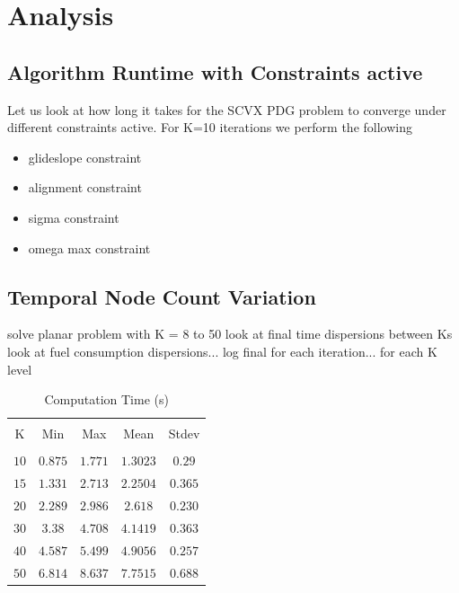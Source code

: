 \chapter{Analysis}
\label{analysis}



\section{Algorithm Runtime with Constraints active}
Let us look at how long it takes for the SCVX PDG problem to converge under different constraints active.  For K=10 iterations we perform the following

\begin{itemize}
	\item  glideslope constraint
	\item alignment constraint
	\item sigma constraint
	\item omega max constraint
\end{itemize}

\section{Temporal Node Count Variation}
solve planar problem with K = 8 to 50
look at final time dispersions between Ks
look at fuel consumption dispersions...
log final for each iteration... for each K level


\begin{table}[ht]
\caption{Computation Time (s)}
\centering 
\begin{tabular}{c c c c c} 
\hline\hline \\[0.5ex] 
K & Min & Max & Mean & Stdev \\ 
\hline \\
$10$    &$0.875 $   &$1.771 $  &$1.3023  $  &$0.29$  \\ 
$15$    &$1.331 $   &$2.713 $  &$2.2504  $  &$0.365$  \\ 
$20$    &$2.289$    &$2.986$   &$2.618  $   &$0.230$  \\ 
$30$    &$ 3.38 $   &$4.708 $  &$4.1419  $  &$0.363$  \\ 
$40$    &$4.587 $   &$5.499 $  &$4.9056  $  &$0.257$  \\ 
$50$    &$6.814 $   &$8.637 $  &$7.7515  $  &$0.688$  \\[1ex] 
\hline
\end{tabular}
\label{table:tableplanar}
\end{table}







